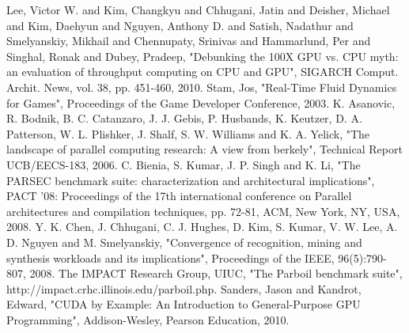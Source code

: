 \documentclass[conference]{IEEEtran}
\begin{document}
\begin{thebibliography}{1}
Lee, Victor W. and Kim, Changkyu and Chhugani, Jatin and Deisher, Michael and Kim, Daehyun and Nguyen, Anthony D. and Satish, Nadathur and Smelyanskiy, Mikhail and Chennupaty, Srinivas and Hammarlund, Per and Singhal, Ronak and Dubey, Pradeep, "Debunking the 100X GPU vs. CPU myth: an evaluation of throughput computing on CPU and GPU", SIGARCH Comput. Archit. News, vol. 38, pp. 451-460, 2010.
Stam, Jos, "Real-Time Fluid Dynamics for Games", Proceedings of the Game Developer Conference, 2003.
K. Asanovic, R. Bodnik, B. C. Catanzaro, J. J. Gebis, P. Husbands, K. Keutzer, D. A. Patterson, W. L. Plishker, J. Shalf, S. W. Williams and K. A. Yelick, "The landscape of parallel computing research: A view from berkely", Technical Report UCB/EECS-183, 2006.
C. Bienia, S. Kumar, J. P. Singh and K. Li, "The PARSEC benchmark suite: characterization and architectural implications", PACT '08: Proceedings of the 17th international conference on Parallel architectures and compilation techniques, pp. 72-81, ACM, New York, NY, USA, 2008.
Y. K. Chen, J. Chhugani, C. J. Hughes, D. Kim, S. Kumar, V. W. Lee, A. D. Nguyen and M. Smelyanskiy, "Convergence of recognition, mining and synthesis workloads and its implications", Proceedings of the IEEE, 96(5):790-807, 2008.
The IMPACT Research Group, UIUC, "The Parboil benchmark suite", http://impact.crhc.illinois.edu/parboil.php.
Sanders, Jason and Kandrot, Edward, "CUDA by Example: An Introduction to General-Purpose GPU Programming", Addison-Wesley, Pearson Education, 2010.
\end{thebibliography}
\end{document}
